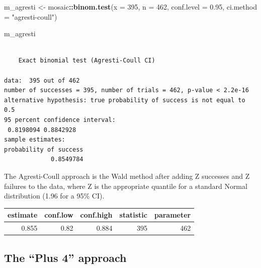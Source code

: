 \documentclass[
]{book}
\newenvironment{Shaded}{\begin{snugshade}}{\end{snugshade}}
\newcommand{\DataTypeTok}[1]{\textcolor[rgb]{0.13,0.29,0.53}{#1}}
\newcommand{\DecValTok}[1]{\textcolor[rgb]{0.00,0.00,0.81}{#1}}
\newcommand{\FloatTok}[1]{\textcolor[rgb]{0.00,0.00,0.81}{#1}}
\newcommand{\KeywordTok}[1]{\textcolor[rgb]{0.13,0.29,0.53}{\textbf{#1}}}
\newcommand{\NormalTok}[1]{#1}
\newcommand{\OperatorTok}[1]{\textcolor[rgb]{0.81,0.36,0.00}{\textbf{#1}}}
\newcommand{\StringTok}[1]{\textcolor[rgb]{0.31,0.60,0.02}{#1}}
\begin{document}
\begin{Shaded}
\begin{Highlighting}[]
\NormalTok{m_agresti <-}\StringTok{ }\NormalTok{mosaic}\OperatorTok{::}\KeywordTok{binom.test}\NormalTok{(}\DataTypeTok{x =} \DecValTok{395}\NormalTok{, }\DataTypeTok{n =} \DecValTok{462}\NormalTok{,}
                                \DataTypeTok{conf.level =} \FloatTok{0.95}\NormalTok{,}
                                \DataTypeTok{ci.method =} \StringTok{"agresti-coull"}\NormalTok{)}

\NormalTok{m_agresti}
\end{Highlighting}
\end{Shaded}

\begin{verbatim}

	Exact binomial test (Agresti-Coull CI)

data:  395 out of 462
number of successes = 395, number of trials = 462, p-value < 2.2e-16
alternative hypothesis: true probability of success is not equal to 0.5
95 percent confidence interval:
 0.8198094 0.8842928
sample estimates:
probability of success 
             0.8549784 
\end{verbatim}

The Agresti-Coull approach is the Wald method after adding Z successes and Z failures to the data, where Z is the appropriate quantile for a standard Normal distribution (1.96 for a 95\% CI).

\begin{Shaded}
\end{Shaded}

\begin{tabular}{r|r|r|r|r}
\hline
estimate & conf.low & conf.high & statistic & parameter\\
\hline
0.855 & 0.82 & 0.884 & 395 & 462\\
\hline
\end{tabular}

\hypertarget{the-plus-4-approach}{%
\subsection{The ``Plus 4'' approach}\label{the-plus-4-approach}}
\end{document}
